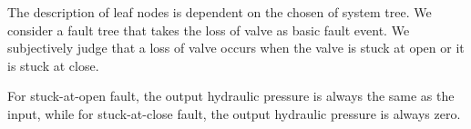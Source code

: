 The description of leaf nodes is dependent on the chosen of system tree\cite{ft02}. 
We consider a fault tree that takes the loss of valve as basic fault event.
We subjectively judge that a loss of valve occurs when the valve is stuck at open or it is stuck at close. 

For stuck-at-open fault, the output hydraulic pressure is always the same as the input, while for stuck-at-close fault, the output hydraulic pressure is always zero.

